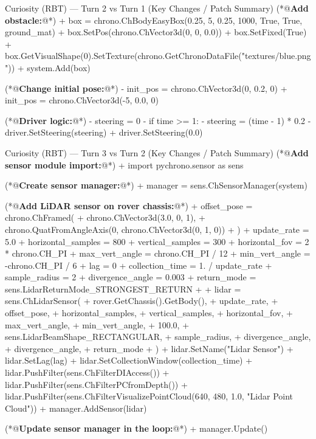 \begin{DiffBlock}{Curiosity (RBT) --- Turn 2 vs Turn 1 (Key Changes / Patch Summary)}
    (*@\textbf{Add obstacle:}@*)
    + box = chrono.ChBodyEasyBox(0.25, 5, 0.25, 1000, True, True, ground_mat)
    + box.SetPos(chrono.ChVector3d(0, 0, 0.0))
    + box.SetFixed(True)
    + box.GetVisualShape(0).SetTexture(chrono.GetChronoDataFile("textures/blue.png"))
    + system.Add(box)
    
    (*@\textbf{Change initial pose:}@*)
    - init_pos = chrono.ChVector3d(0, 0.2, 0)
    + init_pos = chrono.ChVector3d(-5, 0.0, 0)
    
    (*@\textbf{Driver logic:}@*)
    - steering = 0
    - if time >= 1:
    -     steering = (time - 1) * 0.2
    - driver.SetSteering(steering)
    + driver.SetSteering(0.0)
    \end{DiffBlock}
    
    
    \begin{DiffBlock}{Curiosity (RBT) --- Turn 3 vs Turn 2 (Key Changes / Patch Summary)}
    (*@\textbf{Add sensor module import:}@*)
    + import pychrono.sensor as sens
    
    (*@\textbf{Create sensor manager:}@*)
    + manager = sens.ChSensorManager(system)
    
    (*@\textbf{Add LiDAR sensor on rover chassis:}@*)
    + offset_pose = chrono.ChFramed(
    +     chrono.ChVector3d(3.0, 0, 1),
    +     chrono.QuatFromAngleAxis(0, chrono.ChVector3d(0, 1, 0))
    + )
    + update_rate = 5.0
    + horizontal_samples = 800
    + vertical_samples = 300
    + horizontal_fov = 2 * chrono.CH_PI
    + max_vert_angle = chrono.CH_PI / 12
    + min_vert_angle = -chrono.CH_PI / 6
    + lag = 0
    + collection_time = 1. / update_rate
    + sample_radius = 2
    + divergence_angle = 0.003
    + return_mode = sens.LidarReturnMode_STRONGEST_RETURN
    +
    + lidar = sens.ChLidarSensor(
    +     rover.GetChassis().GetBody(),
    +     update_rate,
    +     offset_pose,
    +     horizontal_samples,
    +     vertical_samples,
    +     horizontal_fov,
    +     max_vert_angle,
    +     min_vert_angle,
    +     100.0,
    +     sens.LidarBeamShape_RECTANGULAR,
    +     sample_radius,
    +     divergence_angle,
    +     divergence_angle,
    +     return_mode
    + )
    + lidar.SetName("Lidar Sensor")
    + lidar.SetLag(lag)
    + lidar.SetCollectionWindow(collection_time)
    + lidar.PushFilter(sens.ChFilterDIAccess())
    + lidar.PushFilter(sens.ChFilterPCfromDepth())
    + lidar.PushFilter(sens.ChFilterVisualizePointCloud(640, 480, 1.0, "Lidar Point Cloud"))
    + manager.AddSensor(lidar)
    
    (*@\textbf{Update sensor manager in the loop:}@*)
    + manager.Update()
    \end{DiffBlock}

